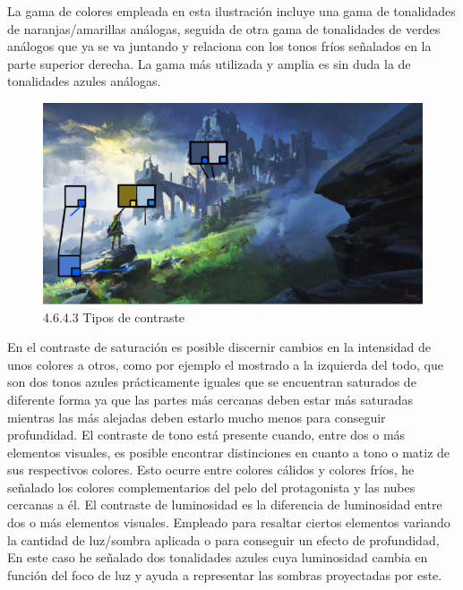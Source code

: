 \documentclass[12pt]{article}
\begin{document}
    La gama de colores empleada en esta ilustración incluye una gama de tonalidades de naranjas/amarillas análogas, seguida de otra gama de tonalidades de verdes análogos que ya se va juntando y relaciona con los tonos fríos señalados en la parte superior derecha. La gama más utilizada y amplia es sin duda la de tonalidades azules análogas.

    \begin{figure}[H]
      \centering
      \includegraphics[width=\textwidth]{images/Nerea/Nerea Zelda concept 643.PNG}
      \caption{\small 4.6.4.3 Tipos de contraste}
    \end{figure}

    En el contraste de saturación es posible discernir cambios en la intensidad de unos colores a otros, como por ejemplo el mostrado a la izquierda del todo, que son dos tonos azules prácticamente iguales que se encuentran saturados de diferente forma ya que las partes más cercanas deben estar más saturadas mientras las más alejadas deben estarlo mucho menos para conseguir profundidad. El contraste de tono está presente cuando, entre dos o más elementos visuales, es posible encontrar distinciones en cuanto a tono o matiz de sus respectivos colores. Esto ocurre entre colores cálidos y colores fríos, he señalado los colores complementarios del pelo del protagonista y las nubes cercanas a él. El contraste de luminosidad es la diferencia de luminosidad entre dos o más elementos visuales. Empleado para resaltar ciertos elementos variando la cantidad de luz/sombra aplicada o para conseguir un efecto de profundidad, En este caso he señalado dos tonalidades azules cuya luminosidad cambia en función del foco de luz y ayuda a representar las sombras proyectadas por este.
\end{document}
